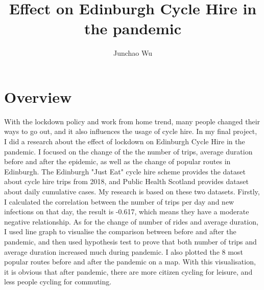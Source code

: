 \documentclass[11pt,a4paper]{article}
\title{Effect on Edinburgh Cycle Hire in the pandemic}
\author{Junchao Wu}
\begin{document}
\maketitle


\section{Overview}
With the lockdown policy and work from home trend, many people changed their ways to go out, and it also influences the usage of cycle hire. In my final project, I did a research about the effect of lockdown on Edinburgh Cycle Hire in the pandemic. I focused on the change of the the number of trips, average duration before and after the epidemic, as well as the change of popular routes in Edinburgh. The Edinburgh "Just Eat" cycle hire scheme provides the dataset about cycle hire trips from 2018\cite{bike-share-dataset}, and Public Health Scotland provides dataset about daily cumulative cases\cite{phs-dataset}. My research is based on these two datasets. Firstly, I calculated the correlation between the number of trips per day and new infections on that day, the result is -0.617, which means they have a moderate negative relationship. As for the change of number of rides and average duration, I used line graph to visualise the comparison between before and after the pandemic, and then used hypothesis test to prove that both number of trips and average duration increased much during pandemic. I also plotted the 8 most popular routes before and after the pandemic on a map. With this visualisation, it is obvious that after pandemic, there are more citizen cycling for leisure, and less people cycling for commuting.
\end{document}
